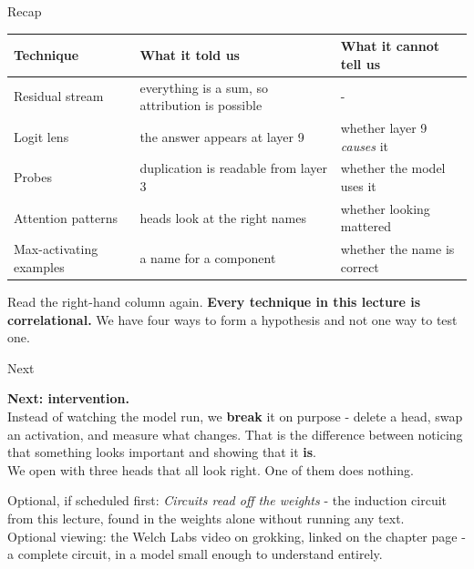 \documentclass[aspectratio=169]{beamer}
\newcommand{\trapbox}[1]{%
  \begin{tcolorbox}[colback=armred!8, colframe=armred, boxrule=0.6pt, arc=2pt]
  #1
  \end{tcolorbox}}
\newcommand{\takebox}[1]{%
  \begin{tcolorbox}[colback=paramgreen!8, colframe=paramgreen, boxrule=0.6pt, arc=2pt]
  #1
  \end{tcolorbox}}
\begin{document}
\begin{frame}{Recap}
  \vspace{0.4em}
  \begin{center}
  \small
  \begin{tabular}{@{}p{}p{}p{}@{}}
    \toprule
    \textbf{Technique} & \textbf{What it told us} & \textbf{What it cannot tell us}\\
    \midrule
    Residual stream & everything is a sum, so attribution is possible & -\\[0.4em]
    Logit lens & the answer appears at layer 9 & whether layer 9 \emph{causes} it\\[0.4em]
    Probes & duplication is readable from layer 3 & whether the model uses it\\[0.4em]
    Attention patterns & heads look at the right names & whether looking mattered\\[0.4em]
    Max-activating examples & a name for a component & whether the name is correct\\
    \bottomrule
  \end{tabular}
  \end{center}

  \vspace{0.7em}
  \trapbox{Read the right-hand column again. \textbf{Every technique in this lecture is
  correlational.} We have four ways to form a hypothesis and not one way to test one.}
\end{frame}

\begin{frame}{Next}
  \vspace{1.2em}
  \takebox{\textbf{Next: intervention.}\\[0.6em]
  Instead of watching the model run, we \textbf{break} it on purpose - delete a head, swap an
  activation, and measure what changes. That is the difference between noticing that something
  looks important and showing that it \textbf{is}.\\[0.8em]
  We open with three heads that all look right. One of them does nothing.}

  \vspace{1.0em}
  \begin{center}
    {\footnotesize Optional, if scheduled first: \emph{Circuits read off the weights} - the induction
    circuit from this lecture, found in the weights alone without running any text.\\[0.3em]
    Optional viewing: the Welch Labs video on grokking, linked on the chapter page - a complete
    circuit, in a model small enough to understand entirely.}
  \end{center}
\end{frame}
\end{document}

